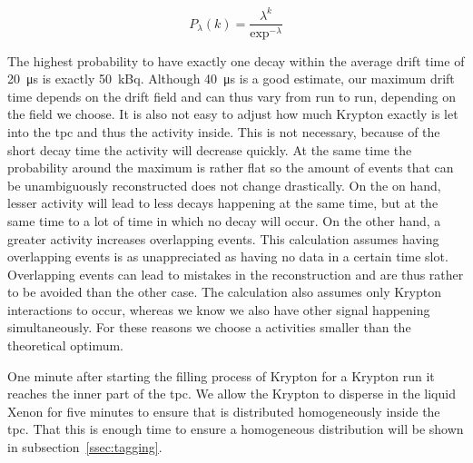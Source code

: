 \begin{equation}
    P_{\lambda}\left(k\right) =  \frac{\lambda^k}{\exp^{-\lambda}}
\end{equation}

The highest probability to have exactly one decay within the average drift time of \SI{20}{\micro\s} is exactly \SI{50}{\kilo\becquerel}.
Although \SI{40}{\micro\s} is a good estimate, our maximum drift time depends on the drift field and can thus vary from run to run, depending on the field we choose.
It is also not easy to adjust how much Krypton exactly is let into the \gls{tpc} and thus the activity inside.
This is not necessary, because of the short decay time the activity will decrease quickly.
At the same time the probability around the maximum is rather flat so the amount of events that can be unambiguously reconstructed does not change drastically.
On the on hand, lesser activity will lead to less decays happening at the same time, but at the same time to a lot of time in which no decay will occur.
On the other hand, a greater activity increases overlapping events.
This calculation assumes having overlapping events is as unappreciated as having no data in a certain time slot.
Overlapping events can lead to mistakes in the reconstruction and are thus rather to be avoided than the other case.
The calculation also assumes only Krypton interactions to occur, whereas we know we also have other signal happening simultaneously.
For these reasons we choose a activities smaller than the theoretical optimum.


One minute after starting the filling process of Krypton for a Krypton run it reaches the inner part of the \gls{tpc}.
We allow the Krypton to disperse in the liquid Xenon for five minutes to ensure that is distributed homogeneously inside the \gls{tpc}.
That this is enough time to ensure a homogeneous distribution will be shown in subsection~\ref{ssec:tagging}.



\FloatBarrier
